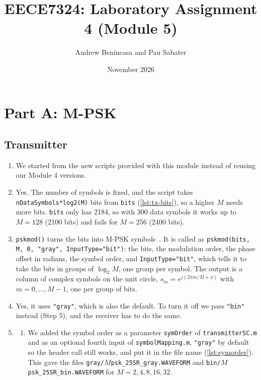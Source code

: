 \documentclass[11pt]{article}
\title{EECE7324: Laboratory Assignment 4 (Module 5)}
\author{Andrew Benincasa and Pau Sabater}
\date{November 2026}
\begin{document}
\maketitle

\section*{Part A: M-PSK}
\subsection*{Transmitter}
\begin{enumerate}
    \item We started from the new scripts provided with this module instead of reusing our Module 4 versions.

    \item Yes. The number of symbols is fixed, and the script takes \texttt{nDataSymbols*log2(M)} bits from \texttt{bits} (\cref{lst:tx-bits}), so a higher $M$ needs more bits. \texttt{bits} only has 2184, so with 300 data symbols it works up to $M = 128$ (2100 bits) and fails for $M = 256$ (2400 bits).



    \item \texttt{pskmod()} turns the bits into M-PSK symbols~\cite{pskmod}. It is called as \texttt{pskmod(bits, M, 0, "gray", InputType="bit")}: the bits, the modulation order, the phase offset in radians, the symbol order, and \texttt{InputType="bit"}, which tells it to take the bits in groups of $\log_2 M$, one group per symbol. The output is a column of complex symbols on the unit circle, $s_m = e^{j(2\pi m/M + \phi)}$ with $m = 0, \dots, M-1$, one per group of bits.

    \item Yes, it uses \texttt{"gray"}, which is also the default. To turn it off we pass \texttt{"bin"} instead (Step 5), and the receiver has to do the same.

    \item
    \begin{enumerate}[label=\alph*)]
        \item We added the symbol order as a parameter \texttt{symOrder} of \texttt{transmitterSC.m} and as an optional fourth input of \texttt{symbolMapping.m}, \texttt{"gray"} by default so the header call still works, and put it in the file name (\cref{lst:symorder}). This gave the files \texttt{gray/$M$psk\_25SR\_gray.WAVEFORM} and \texttt{bin/$M$psk\_25SR\_bin.WAVEFORM} for $M = 2, 4, 8, 16, 32$.


\end{enumerate}
\end{enumerate}
\end{document}
